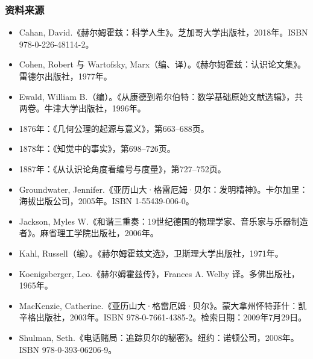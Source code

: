 \subsubsection{资料来源}
\begin{itemize}
\item Cahan, David.《赫尔姆霍兹：科学人生》。芝加哥大学出版社，2018年。ISBN 978-0-226-48114-2。
\item Cohen, Robert 与 Wartofsky, Marx（编、译）。《赫尔姆霍兹：认识论文集》。雷德尔出版社，1977年。
\item Ewald, William B.（编）。《从康德到希尔伯特：数学基础原始文献选辑》，共两卷。牛津大学出版社，1996年。
\item 1876年：《几何公理的起源与意义》，第663–688页。
\item 1878年：《知觉中的事实》，第698–726页。
\item 1887年：《从认识论角度看编号与度量》，第727–752页。
\item Groundwater, Jennifer.《亚历山大·格雷厄姆·贝尔：发明精神》。卡尔加里：海拔出版公司，2005年。ISBN 1-55439-006-0。
\item Jackson, Myles W.《和谐三重奏：19世纪德国的物理学家、音乐家与乐器制造者》。麻省理工学院出版社，2006年。
\item Kahl, Russell（编）。《赫尔姆霍兹文选》，卫斯理大学出版社，1971年。
\item Koenigsberger, Leo.《赫尔姆霍兹传》，Frances A. Welby 译。多佛出版社，1965年。
\item MacKenzie, Catherine.《亚历山大·格雷厄姆·贝尔》。蒙大拿州怀特菲什：凯辛格出版社，2003年。ISBN 978-0-7661-4385-2。检索日期：2009年7月29日。
\item Shulman, Seth.《电话赌局：追踪贝尔的秘密》。纽约：诺顿公司，2008年。ISBN 978-0-393-06206-9。
\end{itemize}
